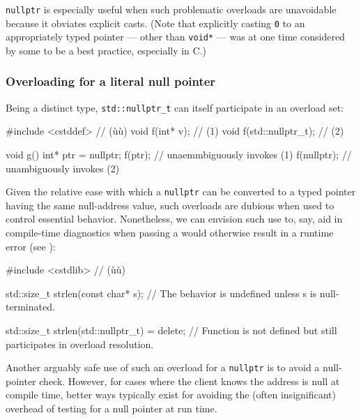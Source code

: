 \noindent\lstinline!nullptr! is especially useful when such problematic overloads
are unavoidable because it obviates explicit
casts. (Note that explicitly casting \lstinline!0! to an
appropriately typed pointer --- other than \lstinline!void*! --- was at one
  time considered by some to be a best practice, especially in C.)

\subsubsection[Overloading for a literal null pointer]{Overloading for a literal null pointer}\label{overloading-for-a-literal-null-pointer}

Being a distinct type, \lstinline!std::nullptr_t! can itself participate
in an overload set:

\begin{emcppslisting}
#include  <cstddef> // (ù{}ù)
void f(int* v);          // (1)
void f(std::nullptr_t);  // (2)

void g()
{
    int* ptr = nullptr;
    f(ptr);      // unaemmbiguously invokes (1)
    f(nullptr);  // unambiguously invokes (2)
}
\end{emcppslisting}


\noindent Given the relative ease with which a \lstinline!nullptr! can be
converted to a typed pointer having the same null-address value, such
overloads are dubious when used to control essential behavior.
Nonetheless, we can envision such use to, say, aid in compile-time
diagnostics when passing a  would otherwise result in
a runtime error (see
):

\begin{emcppshiddenlisting}[emcppsbatch=e4]
#include <cstdlib>  // (ù{}ù)
\end{emcppshiddenlisting}
\begin{emcppslisting}[emcppsbatch=e4]
std::size_t strlen(const char* s);
    // The behavior is undefined unless s is null-terminated.

std::size_t strlen(std::nullptr_t) = delete;
    // Function is not defined but still participates in overload resolution.
\end{emcppslisting}


\noindent Another arguably safe use of such an overload for a \lstinline!nullptr! is
to avoid a null-pointer check. However, for cases where the client knows the address is null at compile time, better ways typically exist for avoiding the (often
insignificant) overhead of testing for a null pointer at run time.

